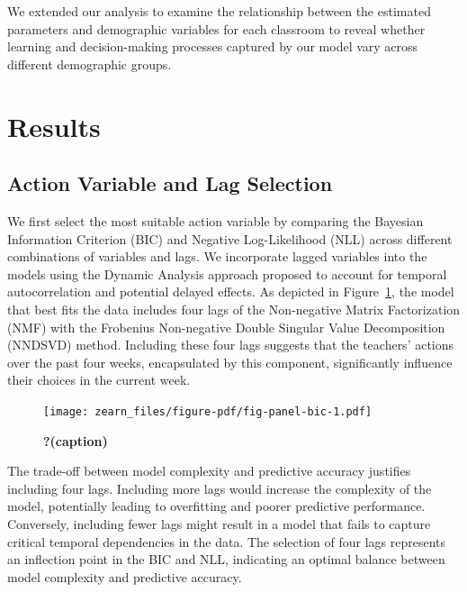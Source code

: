 \documentclass[
  number,
  preprint,
  3p,
  onecolumn]{elsarticle}
\begin{document}
We extended our analysis to examine the relationship between the
estimated parameters and demographic variables for each classroom to
reveal whether learning and decision-making processes captured by our
model vary across different demographic groups.

\hypertarget{results}{%
\section{Results}\label{results}}

\hypertarget{action-variable-and-lag-selection}{%
\subsection{Action Variable and Lag
Selection}\label{action-variable-and-lag-selection}}

We first select the most suitable action variable by comparing the
Bayesian Information Criterion (BIC) and Negative Log-Likelihood (NLL)
across different combinations of variables and lags. We incorporate
lagged variables into the models using the Dynamic Analysis approach
proposed to account for temporal autocorrelation and potential delayed
effects. As depicted in Figure~\ref{fig-panel-bic}, the model that best
fits the data includes four lags of the Non-negative Matrix
Factorization (NMF) with the Frobenius Non-negative Double Singular
Value Decomposition (NNDSVD) method. Including these four lags suggests
that the teachers' actions over the past four weeks, encapsulated by
this component, significantly influence their choices in the current
week.

\begin{figure}

{\centering \texttt{[image: zearn\_files/figure-pdf/fig-panel-bic-1.pdf]}

}

\caption{\label{fig-panel-bic}\textbf{?(caption)}}

\end{figure}

The trade-off between model complexity and predictive accuracy justifies
including four lags. Including more lags would increase the complexity
of the model, potentially leading to overfitting and poorer predictive
performance. Conversely, including fewer lags might result in a model
that fails to capture critical temporal dependencies in the data. The
selection of four lags represents an inflection point in the BIC and
NLL, indicating an optimal balance between model complexity and
predictive accuracy.
\end{document}
